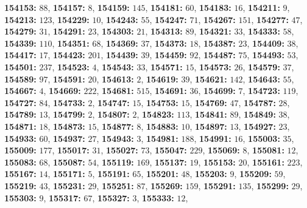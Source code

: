 \textsf{\bfseries 154153:} $88$, \textsf{\bfseries 154157:} $8$, \textsf{\bfseries 154159:} $145$, \textsf{\bfseries 154181:} $60$, \textsf{\bfseries 154183:} $16$, \textsf{\bfseries 154211:} $9$, \textsf{\bfseries 154213:} $123$, \textsf{\bfseries 154229:} $10$, \textsf{\bfseries 154243:} $55$, \textsf{\bfseries 154247:} $71$, \textsf{\bfseries 154267:} $151$, \textsf{\bfseries 154277:} $47$, \textsf{\bfseries 154279:} $31$, \textsf{\bfseries 154291:} $23$, \textsf{\bfseries 154303:} $21$, \textsf{\bfseries 154313:} $89$, \textsf{\bfseries 154321:} $33$, \textsf{\bfseries 154333:} $58$, \textsf{\bfseries 154339:} $110$, \textsf{\bfseries 154351:} $68$, \textsf{\bfseries 154369:} $37$, \textsf{\bfseries 154373:} $18$, \textsf{\bfseries 154387:} $23$, \textsf{\bfseries 154409:} $38$, \textsf{\bfseries 154417:} $17$, \textsf{\bfseries 154423:} $201$, \textsf{\bfseries 154439:} $39$, \textsf{\bfseries 154459:} $92$, \textsf{\bfseries 154487:} $75$, \textsf{\bfseries 154493:} $53$, \textsf{\bfseries 154501:} $237$, \textsf{\bfseries 154523:} $4$, \textsf{\bfseries 154543:} $33$, \textsf{\bfseries 154571:} $15$, \textsf{\bfseries 154573:} $26$, \textsf{\bfseries 154579:} $37$, \textsf{\bfseries 154589:} $97$, \textsf{\bfseries 154591:} $20$, \textsf{\bfseries 154613:} $2$, \textsf{\bfseries 154619:} $39$, \textsf{\bfseries 154621:} $142$, \textsf{\bfseries 154643:} $55$, \textsf{\bfseries 154667:} $4$, \textsf{\bfseries 154669:} $222$, \textsf{\bfseries 154681:} $515$, \textsf{\bfseries 154691:} $36$, \textsf{\bfseries 154699:} $7$, \textsf{\bfseries 154723:} $119$, \textsf{\bfseries 154727:} $84$, \textsf{\bfseries 154733:} $2$, \textsf{\bfseries 154747:} $15$, \textsf{\bfseries 154753:} $15$, \textsf{\bfseries 154769:} $47$, \textsf{\bfseries 154787:} $28$, \textsf{\bfseries 154789:} $13$, \textsf{\bfseries 154799:} $2$, \textsf{\bfseries 154807:} $2$, \textsf{\bfseries 154823:} $113$, \textsf{\bfseries 154841:} $89$, \textsf{\bfseries 154849:} $38$, \textsf{\bfseries 154871:} $18$, \textsf{\bfseries 154873:} $15$, \textsf{\bfseries 154877:} $8$, \textsf{\bfseries 154883:} $10$, \textsf{\bfseries 154897:} $13$, \textsf{\bfseries 154927:} $23$, \textsf{\bfseries 154933:} $60$, \textsf{\bfseries 154937:} $27$, \textsf{\bfseries 154943:} $3$, \textsf{\bfseries 154981:} $188$, \textsf{\bfseries 154991:} $16$, \textsf{\bfseries 155003:} $35$, \textsf{\bfseries 155009:} $177$, \textsf{\bfseries 155017:} $31$, \textsf{\bfseries 155027:} $73$, \textsf{\bfseries 155047:} $229$, \textsf{\bfseries 155069:} $8$, \textsf{\bfseries 155081:} $12$, \textsf{\bfseries 155083:} $68$, \textsf{\bfseries 155087:} $54$, \textsf{\bfseries 155119:} $169$, \textsf{\bfseries 155137:} $19$, \textsf{\bfseries 155153:} $20$, \textsf{\bfseries 155161:} $223$, \textsf{\bfseries 155167:} $14$, \textsf{\bfseries 155171:} $5$, \textsf{\bfseries 155191:} $65$, \textsf{\bfseries 155201:} $48$, \textsf{\bfseries 155203:} $9$, \textsf{\bfseries 155209:} $59$, \textsf{\bfseries 155219:} $43$, \textsf{\bfseries 155231:} $29$, \textsf{\bfseries 155251:} $87$, \textsf{\bfseries 155269:} $159$, \textsf{\bfseries 155291:} $135$, \textsf{\bfseries 155299:} $29$, \textsf{\bfseries 155303:} $9$, \textsf{\bfseries 155317:} $67$, \textsf{\bfseries 155327:} $3$, \textsf{\bfseries 155333:} $12$, 
